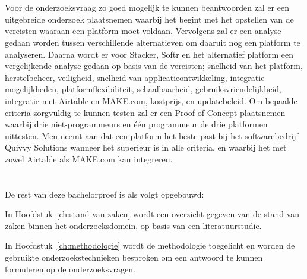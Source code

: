 \section{}%
\label{sec:onderzoeksdoelstelling}
Voor de onderzoeksvraag zo goed mogelijk te kunnen beantwoorden zal er een uitgebreide onderzoek plaatsnemen waarbij het begint met het opstellen 
van de vereisten waaraan een platform moet voldaan. Vervolgens zal er een analyse gedaan worden tussen verschillende alternatieven om daaruit nog een platform 
te analyseren. Daarna wordt er voor Stacker, Softr en het alternatief platform een vergelijkende analyse gedaan op basis van de vereisten; snelheid van het platform, 
herstelbeheer, veiligheid, snelheid van applicatieontwikkeling, integratie mogelijkheden, platformflexibiliteit, schaalbaarheid, gebruiksvriendelijkheid, integratie met 
Airtable en MAKE.com, kostprijs, en updatebeleid. Om bepaalde criteria zorgvuldig te kunnen testen zal er een Proof of Concept plaatsnemen waarbij drie 
niet-programmeurs en één programmeur de drie platformen uittesten. Men neemt aan dat een platform het beste past bij het softwarebedrijf Quivvy Solutions wanneer het superieur is in alle criteria, en 
waarbij het met zowel Airtable als MAKE.com kan integreren.

\section{}%
\label{sec:opzet-bachelorproef}


De rest van deze bachelorproef is als volgt opgebouwd:

In Hoofdstuk~\ref{ch:stand-van-zaken} wordt een overzicht gegeven van de stand van zaken binnen het onderzoeksdomein, op basis van een literatuurstudie.

In Hoofdstuk~\ref{ch:methodologie} wordt de methodologie toegelicht en worden de gebruikte onderzoekstechnieken besproken om een antwoord te kunnen formuleren op de onderzoeksvragen.

